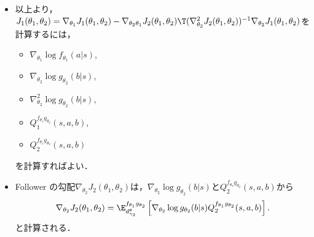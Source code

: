 \documentclass[a4paper,10pt,dvipdfmx]{jsarticle}
\begin{document}
\begin{itemize}
\begin{itemize}
        \begin{theorem}\label{thrm:SSPG_nabla_22_J_2}
            \begin{align}
                \nabla_{\theta_2}^2J_2(\theta_1,\theta_2)=\dfrac{1}{1-\gamma_2}\E_{d_{\gamma_2}^{\theta}}^{f_{\theta_1}g_{\theta_2}}\Bigg[\dfrac{1}{1-\gamma_2}\E_{d_{\gamma_2}^{\theta}}^{f_{\theta_1}g_{\theta_2}}\bigg[&\nabla_{\theta_2}\log g_{\theta_2}(\dot{b}|\dot{s})Q_2^{f_{\theta_1}g_{\theta_2}}(\dot{s},\dot{a},\dot{b})\nabla_{\theta_2}\log g_{\theta_2}(b|s)\T\nonumber\\
                +&\nabla_{\theta_2}\log g_{\theta_2}(b|s)Q_2^{f_{\theta_1}g_{\theta_2}}(\dot{s},\dot{a},\dot{b})\nabla_{\theta_2}\log g_{\theta_2}(\dot{b}|\dot{s})\T\bigg|s,a,b\bigg]\nonumber\\
                -&\nabla_{\theta_2}\log g_{\theta_2}(b|s)Q_2^{f_{\theta_1}g_{\theta_2}}(s,a,b)\nabla_{\theta_2}\log g_{\theta_2}(b|s)\T\nonumber\\
                +&\nabla_{\theta_2}^2\log g_{\theta_2}(b|s)Q_2^{f_{\theta_1}g_{\theta_2}}(s,a,b)\Bigg].
            \end{align}
        \end{theorem}
        \begin{proof}
            See 
        \end{proof}
    \end{itemize}

    \item 以上より，$J_1(\theta_1,\theta_2)=\nabla_{\theta_1}J_1(\theta_1,\theta_2)-\nabla_{\theta_2\theta_1}J_2(\theta_1,\theta_2)\T(\nabla_{\theta_2}^2J_2(\theta_1,\theta_2))^{-1}\nabla_{\theta_2}J_1(\theta_1,\theta_2)$を計算するには，
    \begin{itemize}
        \item $\nabla_{\theta_1}\log f_{\theta_1}(a|s)$,
        \item $\nabla_{\theta_2}\log g_{\theta_2}(b|s)$,
        \item $\nabla_{\theta_2}^2\log g_{\theta_2}(b|s)$,
        \item $Q_1^{f_{\theta_1}g_{\theta_2}}(s,a,b)$,
        \item $Q_2^{f_{\theta_1}g_{\theta_2}}(s,a,b)$
    \end{itemize}
    を計算すればよい．
    \item Follower の勾配$\nabla_{\theta_2}J_2(\theta_1,\theta_2)$は，$\nabla_{\theta_2}\log g_{\theta_2}(b|s)$と$Q_2^{f_{\theta_1}g_{\theta_2}}(s,a,b)$から
    \begin{gather}
        \nabla_{\theta_2}J_2(\theta_1,\theta_2)=\E_{d_{\gamma_2}^{\theta}}^{f_{\theta_1}g_{\theta_2}}\left[\nabla_{\theta_2}\log g_{\theta_2}(b|s)Q_2^{f_{\theta_1}g_{\theta_2}}(s,a,b)\right].
    \end{gather}
    と計算される．
\end{itemize}
\end{document}
